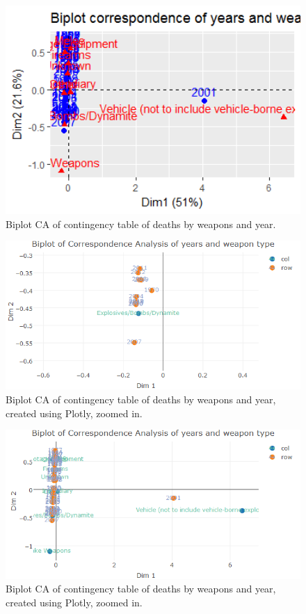 \begin{figure}[t]
\includegraphics[width=15cm]{Peters_experiment_markdown_files/figure-latex/Rplot_CABIPLOT.png}
\caption{Biplot CA of contingency table of deaths by weapons and year.}
\label{fig:biplotweaponsyears}
\centering
\end{figure}

\begin{figure}[t]
\includegraphics[width=15cm]{Peters_experiment_markdown_files/figure-latex/biplot_zoomin.png}
\caption{Biplot CA of contingency table of deaths by weapons and year, created using Plotly, zoomed in.}
\label{fig:biplotweaponsyearsplotlyzoomin}
\centering
\end{figure}

\begin{figure}[t]
\includegraphics[width=15cm]{Peters_experiment_markdown_files/figure-latex/biplot_zoomout.png}
\caption{Biplot CA of contingency table of deaths by weapons and year, created using Plotly, zoomed in.}
\label{fig:biplotweaponsyearsplotlyzoomout}
\centering
\end{figure}

